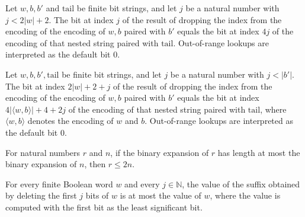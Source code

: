 \begin{lemma}
\label{Complexity.dropIdx_prefix_address}
\leanok
{}
Let $w,b,b'$ and $\mathrm{tail}$ be finite bit strings, and let $j$ be a natural number
with $j<2|w|+2$. The bit at index $j$ of the result of dropping the index from the
encoding of the encoding of $w,b$ paired with $b'$ equals the bit at index $4j$ of the
encoding of that nested string paired with $\mathrm{tail}$. Out-of-range lookups are
interpreted as the default bit $0$.
\end{lemma}

\begin{lemma}
\label{Complexity.dropIdx_suffix_address}
\leanok
{}
Let $w,b,b',\mathrm{tail}$ be finite bit strings, and let $j$ be a natural number with
$j<|b'|$. The bit at index $2|w|+2+j$ of the result of dropping the index from the
encoding of the encoding of $w,b$ paired with $b'$ equals the bit at index $4|\langle
w,b\rangle|+4+2j$ of the encoding of that nested string paired with $\mathrm{tail}$,
where $\langle w,b\rangle$ denotes the encoding of $w$ and $b$. Out-of-range lookups are
interpreted as the default bit $0$.
\end{lemma}

\begin{lemma}
\label{Complexity.query_index_bound}
\leanok
{}
For natural numbers $r$ and $n$, if the binary expansion of $r$ has length at most the
binary expansion of $n$, then $r \le 2n$.
\end{lemma}

\begin{lemma}
\label{Complexity.query_suffix_value_le}
\leanok
{}
For every finite Boolean word $w$ and every $j\in\mathbb{N}$, the value of the suffix
obtained by deleting the first $j$ bits of $w$ is at most the value of $w$, where the
value is computed with the first bit as the least significant bit.
\end{lemma}

